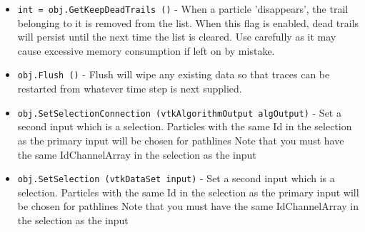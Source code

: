 \begin{itemize}
\item  \verb|int = obj.GetKeepDeadTrails ()| -  When a particle 'disappears', the trail belonging to it is removed from
 the list. When this flag is enabled, dead trails will persist
 until the next time the list is cleared. Use carefully as it may cause
 excessive memory consumption if left on by mistake.

\item  \verb|obj.Flush ()| -  Flush will wipe any existing data so that traces can be restarted from
 whatever time step is next supplied.

\item  \verb|obj.SetSelectionConnection (vtkAlgorithmOutput algOutput)| -  Set a second input which is a selection. Particles with the same
 Id in the selection as the primary input will be chosen for pathlines
 Note that you must have the same IdChannelArray in the selection as the input

\item  \verb|obj.SetSelection (vtkDataSet input)| -  Set a second input which is a selection. Particles with the same
 Id in the selection as the primary input will be chosen for pathlines
 Note that you must have the same IdChannelArray in the selection as the input

\end{itemize}

